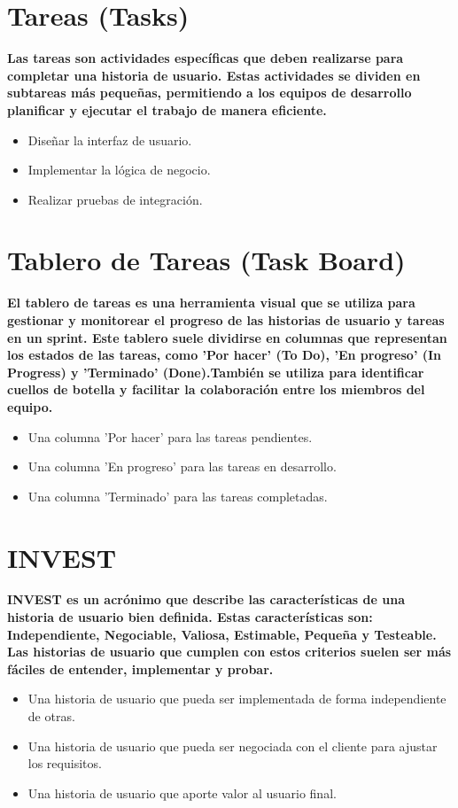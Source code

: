 \documentclass[twocolumn]{article}
\begin{document}
\section*{Tareas (Tasks)}
\textbf{Las tareas son actividades específicas que deben realizarse para completar una historia de usuario. Estas actividades se dividen en subtareas más pequeñas, permitiendo a los equipos de desarrollo planificar y ejecutar el trabajo de manera eficiente.}
\begin{itemize}[label=\textbullet]
\item Diseñar la interfaz de usuario.
\item Implementar la lógica de negocio.
\item Realizar pruebas de integración.
\end{itemize}
\section*{Tablero de Tareas (Task Board)}
\textbf{El tablero de tareas es una herramienta visual que se utiliza para gestionar y monitorear el progreso de las historias de usuario y tareas en un sprint. Este tablero suele dividirse en columnas que representan los estados de las tareas, como 'Por hacer' (To Do), 'En progreso' (In Progress) y 'Terminado' (Done).También se utiliza para identificar cuellos de botella y facilitar la colaboración entre los miembros del equipo.}
\begin{itemize}[label=\textbullet]
\item Una columna 'Por hacer' para las tareas pendientes.
\item Una columna 'En progreso' para las tareas en desarrollo.
\item Una columna 'Terminado' para las tareas completadas.
\end{itemize}
\section*{INVEST}
\textbf{INVEST es un acrónimo que describe las características de una historia de usuario bien definida. Estas características son: Independiente, Negociable, Valiosa, Estimable, Pequeña y Testeable. Las historias de usuario que cumplen con estos criterios suelen ser más fáciles de entender, implementar y probar.}
\begin{itemize}[label=\textbullet]
\item Una historia de usuario que pueda ser implementada de forma independiente de otras.
\item Una historia de usuario que pueda ser negociada con el cliente para ajustar los requisitos.
\item Una historia de usuario que aporte valor al usuario final.
\end{itemize}
\end{document}
